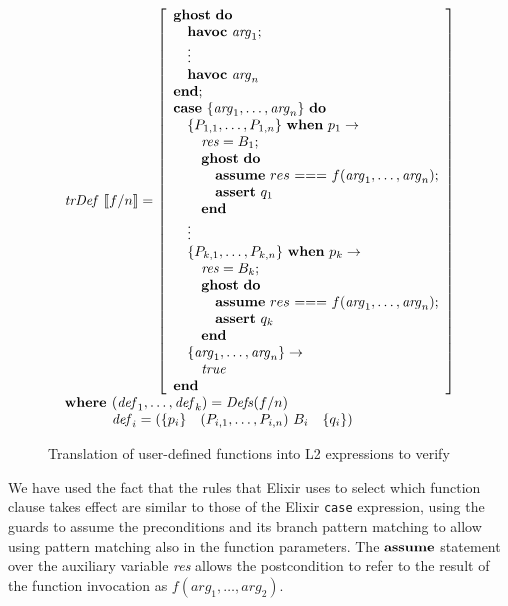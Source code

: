 \begin{figure}
\[
\begin{array}{l}
\trDef{f/n} = \left[ \begin{array}{l}
\ghostE~\doW\\
\quad\havocE~\mathit{arg}_1;\\
\quad\vdots\\
\quad\havocE~\mathit{arg}_n\\
\Wend;\\
\caseE~\{\mathit{arg}_1,\dots,\mathit{arg}_n\}~\doW \\
\quad \{P_{1,1},\dots,P_{1,n}\}~\whenE~p_1 \rightarrow\\ 
\quad\quad \mathit{res} = B_1; \\
\quad\quad \ghostE~\doW\\ 
\quad\quad\quad\assumeE~res~\mathit{===}~f(\mathit{arg}_1,\dots,\mathit{arg}_n);\\
\quad\quad\quad\assertE~q_1\\
\quad\quad \Wend\\
\quad\vdots\\
\quad \{P_{k,1},\dots,P_{k,n}\}~\whenE~p_k \rightarrow\\ 
\quad\quad \mathit{res} = B_k; \\
\quad\quad \ghostE~\doW\\ 
\quad\quad\quad\assumeE~res~\mathit{===}~f(\mathit{arg}_1,\dots,\mathit{arg}_n);\\
\quad\quad\quad\assertE~q_k\\
\quad\quad \Wend\\
\quad \{\mathit{arg}_1,\dots,\mathit{arg}_n\} \rightarrow\\
\quad\quad\true\\ 
\Wend
\end{array}
\right]\\
\textbf{where } (\mathit{def}_1, \dots, \mathit{def}_k) = \Defs{f/n}\\
\phantom{\textbf{where }} \mathit{def}_i = \left(\{ p_i \}  \quad (P_{i,1}, \dots, P_{i,n})~B_i \quad \{ q_i \} \right) 
\end{array}
\]
\caption{Translation of user-defined functions into L2 expressions to verify}
\label{fig:deftr}
\end{figure}

We have used the fact that the rules that Elixir uses to select which function
clause takes effect are similar to those of the Elixir \verb|case| expression,
using the guards to assume the preconditions and its branch pattern matching to
allow using pattern matching also in the function parameters. The $\textbf{assume}$
statement over the auxiliary variable \textit{res} allows the postcondition to
refer to the result of the function invocation as $f(\mathit{arg_1}, \dots,
\mathit{arg_2})$.

